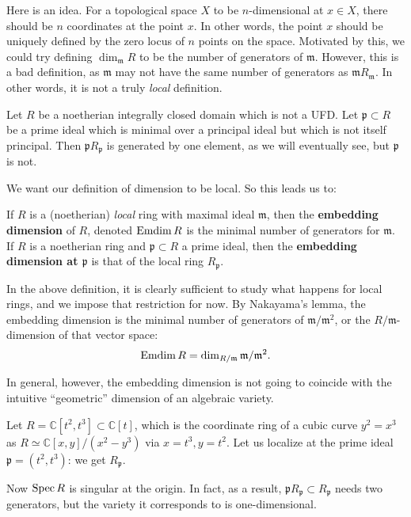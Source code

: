 Here  is an idea. For a topological space $X$ to be $n$-dimensional at $x \in
X$, there should be $n$ coordinates at the point $x$. In other words, the
point $x$ should be uniquely  defined
by the zero locus of $n$ points on the space.
Motivated by this, we could try defining $\dim_{\mathfrak{m}} R$
to be the number of generators of $\mathfrak{m}$.
However, this is a bad definition, as $\mathfrak{m}$ may not have the same number of
generators as $\mathfrak{m}R_{\mathfrak{m}}$. In other words, it is not a
truly \emph{local} definition.
\begin{example} 
Let $R$ be a noetherian integrally closed domain which is not a UFD. Let $\mathfrak{p}
\subset R$ be a prime ideal which is minimal over a principal ideal but which
is not itself principal. Then $\mathfrak{p}R_{\mathfrak{p}}$ is generated by
one element, as we will eventually see, but $\mathfrak{p}$ is not.
\end{example} 

We want our definition of dimension to be
local.
So this leads us to:
\begin{definition} 
If $R$ is a (noetherian) \emph{local} ring with maximal ideal $\mathfrak{m}$,
then the \textbf{embedding dimension} of $R$, denoted $\operatorname{Emdim} R$ is
the minimal number of generators for $\mathfrak{m}$. If $R$ is a  noetherian
ring and $\mathfrak{p} \subset R$ a prime ideal, then the \textbf{embedding
dimension at $\mathfrak{p}$} is that of the local ring $R_{\mathfrak{p}}$.
\end{definition} 

In the above definition, it is clearly sufficient to study what happens for
local rings, and we impose that restriction for now. By Nakayama's lemma, the
embedding dimension is the minimal number of generators of
$\mathfrak{m}/\mathfrak{m}^2$, or the $R/\mathfrak{m}$-dimension of that vector
space:
\[ \operatorname{Emdim} R = \dim_{R/\mathfrak{m}} \mathfrak{m}/ \mathfrak{m}^2.  \]


In general, however, the embedding dimension is not going to coincide with the
intuitive ``geometric'' dimension of an algebraic
variety.

\begin{example} 
Let $R = \mathbb{C}[t^2, t^3] \subset \mathbb{C}[t]$, which is the coordinate
ring of a cubic curve $y^2 =x^3$ as $R \simeq \mathbb{C}[x,y]/(x^2 - y^3)$
via $x = t^3, y = t^2$. Let us localize at the prime ideal $\mathfrak{p} = (t^2,
t^3)$: we get $R_{\mathfrak{p}}$. 

Now $\operatorname{Spec} R$ is singular at the origin. In fact, as a result, $\mathfrak{p}
R_{\mathfrak{p}} \subset R_{\mathfrak{p}}$ needs two generators, but the
variety it corresponds to is one-dimensional.
\end{example} 

